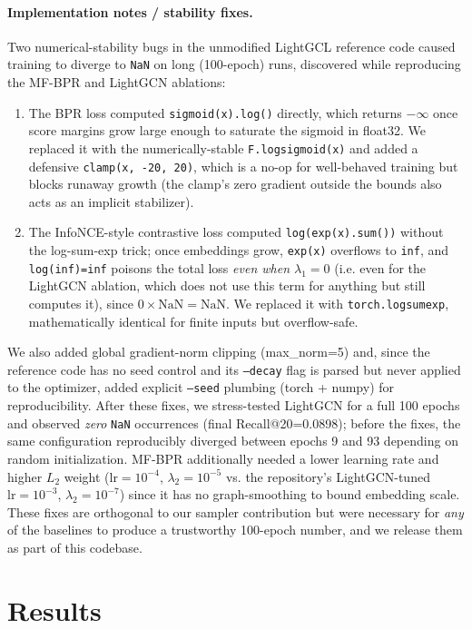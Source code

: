 \documentclass{article}
\begin{document}
\paragraph{Implementation notes / stability fixes.}
\label{sec:stability}
Two numerical-stability bugs in the unmodified LightGCL reference code caused training to
diverge to \texttt{NaN} on long (100-epoch) runs, discovered while reproducing the
MF-BPR and LightGCN ablations:
\begin{enumerate}
\item The BPR loss computed \texttt{sigmoid(x).log()} directly, which returns $-\infty$
once score margins grow large enough to saturate the sigmoid in float32. We replaced it
with the numerically-stable \texttt{F.logsigmoid(x)} and added a defensive
\texttt{clamp(x, -20, 20)}, which is a no-op for well-behaved training but blocks
runaway growth (the clamp's zero gradient outside the bounds also acts as an implicit
stabilizer).
\item The InfoNCE-style contrastive loss computed \texttt{log(exp(x).sum())} without the
log-sum-exp trick; once embeddings grow, \texttt{exp(x)} overflows to \texttt{inf}, and
\texttt{log(inf)=inf} poisons the total loss \emph{even when $\lambda_1=0$} (i.e. even
for the LightGCN ablation, which does not use this term for anything but still computes
it), since $0 \times \mathrm{NaN} = \mathrm{NaN}$. We replaced it with
\texttt{torch.logsumexp}, mathematically identical for finite inputs but overflow-safe.
\end{enumerate}
We also added global gradient-norm clipping (max\_norm=5) and, since the reference code
has no seed control and its \texttt{--decay} flag is parsed but never applied to the
optimizer, added explicit \texttt{--seed} plumbing (torch + numpy) for reproducibility.
After these fixes, we stress-tested LightGCN for a full 100 epochs and observed
\emph{zero} \texttt{NaN} occurrences (final Recall@20=0.0898); before the fixes, the same
configuration reproducibly diverged between epochs 9 and 93 depending on random
initialization. MF-BPR additionally needed a lower learning rate and higher $L_2$ weight
($\mathrm{lr}=10^{-4}$, $\lambda_2=10^{-5}$ vs. the repository's LightGCN-tuned
$\mathrm{lr}=10^{-3}$, $\lambda_2=10^{-7}$) since it has no graph-smoothing to bound
embedding scale. These fixes are orthogonal to our sampler contribution but were
necessary for \emph{any} of the baselines to produce a trustworthy 100-epoch number, and
we release them as part of this codebase.

\section{Results}
\end{document}
